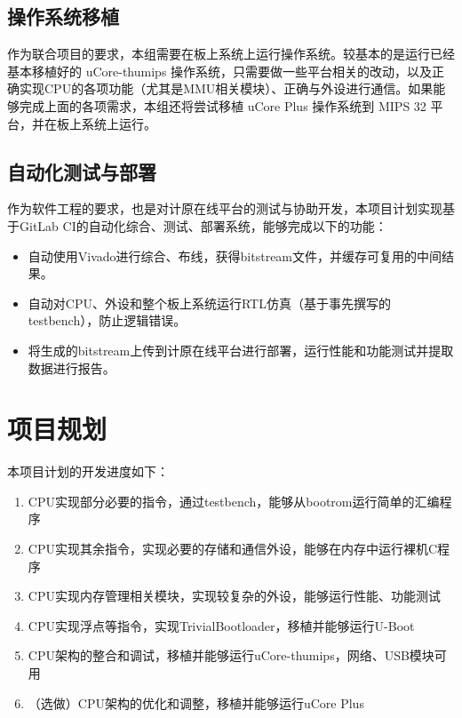 \subsection{操作系统移植}

作为联合项目的要求，本组需要在板上系统上运行操作系统。较基本的是运行已经基本移植好的 uCore-thumips 操作系统，只需要做一些平台相关的改动，以及正确实现CPU的各项功能（尤其是MMU相关模块）、正确与外设进行通信。如果能够完成上面的各项需求，本组还将尝试移植 uCore Plus 操作系统到 MIPS 32 平台，并在板上系统上运行。

\subsection{自动化测试与部署}

作为软件工程的要求，也是对计原在线平台的测试与协助开发，本项目计划实现基于GitLab CI的自动化综合、测试、部署系统，能够完成以下的功能：

\begin{itemize}

    \item 自动使用Vivado进行综合、布线，获得bitstream文件，并缓存可复用的中间结果。
    \item 自动对CPU、外设和整个板上系统运行RTL仿真（基于事先撰写的testbench），防止逻辑错误。
    \item 将生成的bitstream上传到计原在线平台进行部署，运行性能和功能测试并提取数据进行报告。

\end{itemize}

\section{项目规划}

本项目计划的开发进度如下：

\begin{enumerate}

    \item CPU实现部分必要的指令，通过testbench，能够从bootrom运行简单的汇编程序
    \item CPU实现其余指令，实现必要的存储和通信外设，能够在内存中运行裸机C程序
    \item CPU实现内存管理相关模块，实现较复杂的外设，能够运行性能、功能测试
    \item CPU实现浮点等指令，实现TrivialBootloader，移植并能够运行U-Boot
    \item CPU架构的整合和调试，移植并能够运行uCore-thumips，网络、USB模块可用
    \item （选做）CPU架构的优化和调整，移植并能够运行uCore Plus

\end{enumerate}

